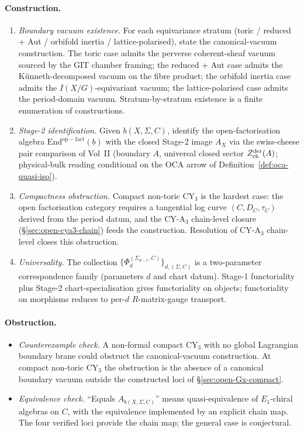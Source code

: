 \paragraph{Construction.}
\begin{enumerate}[nosep]
\item \emph{Boundary vacuum existence.} For each equivariance stratum
  (toric / reduced + Aut / orbifold inertia / lattice-polarised), state
  the canonical-vacuum construction. The toric case admits the
  perverse coherent-sheaf vacuum sourced by the GIT chamber framing;
  the reduced + Aut case admits the K\"unneth-decomposed vacuum on the
  fibre product; the orbifold inertia case admits the
  $I(X/G)$-equivariant vacuum; the lattice-polarised case admits the
  period-domain vacuum. Stratum-by-stratum existence is a finite
  enumeration of constructions.
\item \emph{Stage-2 identification.} Given $b(X, \Sigma, C)$, identify
  the open-factorisation algebra $\mathrm{End}^{\mathrm{op-fact}}(b)$
  with the closed Stage-2 image $A_X$ via the swiss-cheese pair
  comparison of Vol~II (boundary $A$, universal closed sector
	  $Z^{\mathrm{der}}_{\mathrm{ch}}(A)$; physical-bulk reading conditional on the OCA arrow
  of Definition~\ref{def:oca-quasi-iso}).
\item \emph{Compactness obstruction.} Compact non-toric CY$_3$ is the
  hardest case: the open factorisation category requires a tangential
  log curve $(C, D_C, \tau_C)$ derived from the period datum, and the
  CY-A$_3$ chain-level closure (\S\ref{sec:open-cya3-chain})
  feeds the construction. Resolution of CY-A$_3$ chain-level closes
  this obstruction.
\item \emph{Universality.} The collection
  $\{\Phi^{(\Sigma_{d-1}, C)}_d\}_{d, (\Sigma, C)}$ is a two-parameter
  correspondence family (parameters $d$ and chart datum). Stage-1
  functoriality plus Stage-2 chart-specialisation gives functoriality
  on objects; functoriality on morphisms reduces to per-$d$
  $R$-matrix-gauge transport.
\end{enumerate}

\paragraph{Obstruction.}
\begin{itemize}[nosep]
\item \emph{Counterexample check.} A non-formal compact CY$_3$ with no
  global Lagrangian boundary brane could obstruct the canonical-vacuum
  construction. At compact non-toric CY$_3$ the obstruction is the
  absence of a canonical boundary vacuum outside the constructed loci
  of \S\ref{sec:open-Gx-compact}.
\item \emph{Equivalence check.} ``Equals $A_{b(X, \Sigma, C)}$'' means
  quasi-equivalence of $E_1$-chiral algebras on $C$, with the
  equivalence implemented by an explicit chain map. The four verified
  loci provide the chain map; the general case is conjectural.
\end{itemize}

